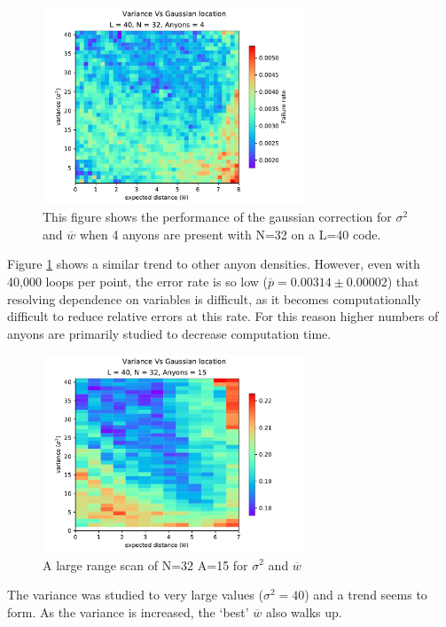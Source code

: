 \begin{figure}[htpb]
\centering
	\includegraphics[width = 0.7\textwidth]{figs/A4N32l40000.pdf}
\caption{This figure shows the performance of the gaussian correction for $\sigma^2$ and $\overline{w}$ when 4 anyons are present with N=32 on a L=40 code.}
\label{fig:A4rough}
\end{figure}

Figure \ref{fig:A4rough} shows a similar trend to other anyon densities. However, even with 40,000 loops per point, the error rate is so low ($\overline{p} = 0.00314\pm 0.00002$) that resolving dependence on variables is difficult, as it becomes computationally difficult to reduce relative errors at this rate. For this reason higher numbers of anyons are primarily studied to decrease computation time.

\begin{figure}
\centering
\includegraphics[width = 0.7\textwidth]{figs/variancevslocation_combined.pdf}
\caption{A large range scan of N=32 A=15 for $\sigma^2$ and $\overline{w}$}
\label{fig:A15rough}
\end{figure}
The variance was studied to very large values ($\sigma^2 = 40$) and a trend seems to form. As the variance is increased, the `best' $\overline{w}$ also walks up.




